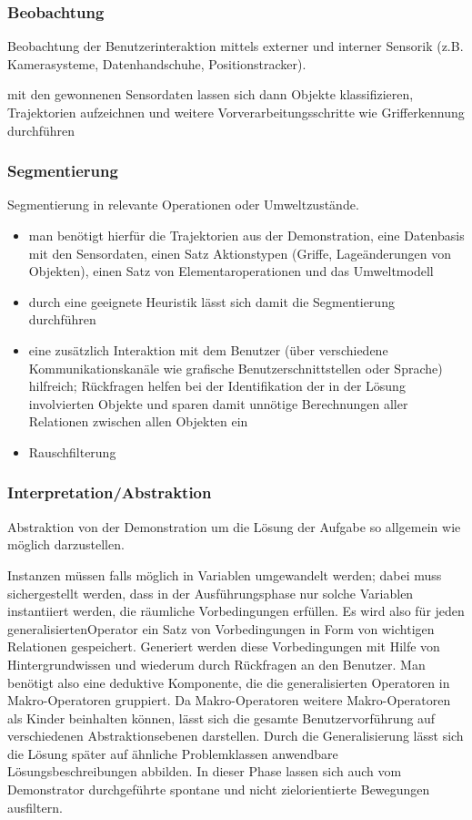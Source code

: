 \subsubsection*{Beobachtung}
Beobachtung der Benutzerinteraktion mittels externer und interner Sensorik (z.B. Kamerasysteme, Datenhandschuhe, Positionstracker).\\
\begin{itemize}
\ita mit den gewonnenen Sensordaten lassen sich dann Objekte klassifizieren, Trajektorien aufzeichnen und weitere Vorverarbeitungsschritte wie
Grifferkennung durchführen
\end{itemize}

\subsubsection*{Segmentierung}
Segmentierung in relevante Operationen oder Umweltzustände. 
\begin{itemize}
\item man benötigt hierfür die Trajektorien aus der Demonstration, eine Datenbasis mit den Sensordaten, einen Satz Aktionstypen (Griffe, Lageänderungen von Objekten), einen Satz
von Elementaroperationen und das Umweltmodell
\item durch eine geeignete Heuristik lässt sich damit die Segmentierung durchführen
\item eine zusätzlich Interaktion mit dem Benutzer (über verschiedene Kommunikationskanäle wie grafische Benutzerschnittstellen oder Sprache) hilfreich; 
Rückfragen helfen bei der Identifikation der in der Lösung involvierten Objekte und sparen damit unnötige Berechnungen aller Relationen zwischen allen Objekten
ein
\item Rauschfilterung
\end{itemize}
\subsubsection*{Interpretation/Abstraktion}
Abstraktion von der Demonstration um die Lösung der Aufgabe so allgemein wie möglich darzustellen.
\begin{itemize}
\ita Instanzen müssen falls möglich in Variablen umgewandelt werden; dabei muss sichergestellt werden, dass in der Ausführungsphase nur solche Variablen instantiiert
werden, die räumliche Vorbedingungen erfüllen. Es wird also für jeden \Gu generalisierten\Go Operator ein Satz von Vorbedingungen in Form von wichtigen Relationen
gespeichert. Generiert werden diese Vorbedingungen mit Hilfe von Hintergrundwissen und wiederum durch Rückfragen an den Benutzer. Man benötigt also eine deduktive
Komponente, die die generalisierten Operatoren in Makro-Operatoren gruppiert. Da Makro-Operatoren weitere Makro-Operatoren als Kinder beinhalten können, lässt
sich die gesamte Benutzervorführung auf verschiedenen Abstraktionsebenen darstellen. Durch die Generalisierung lässt sich die Lösung später auf ähnliche Problemklassen anwendbare Lösungsbeschreibungen abbilden. In dieser Phase lassen sich auch vom Demonstrator durchgeführte spontane und nicht zielorientierte Bewegungen ausfiltern.
\end{itemize}
